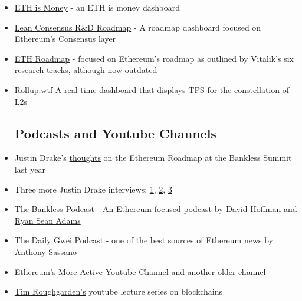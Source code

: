 \documentclass[12pt]{article}
\begin{document}
\begin{itemize}
    \item \href{https://www.ethismoney.xyz/}{ETH is Money} - an ETH is money dashboard
    \item \href{https://leanroadmap.org/}{Lean Consensus R\&D Roadmap} - A roadmap dashboard focused on Ethereum's Consensus layer
    \item \href{https://ethroadmap.com/}{ETH Roadmap} - focused on Ethereum's roadmap as outlined by Vitalik's six research tracks, although now outdated
    \item \href{https://rollup.wtf/}{Rollup.wtf} A real time dashboard that displays TPS for the constellation of L2s
    
\subsection{Podcasts and Youtube Channels}
    \item Justin Drake's \href{https://youtu.be/8mJDt8TGebc?si=pu-F31lkjmbDXMcA}{thoughts} on the Ethereum Roadmap at the Bankless Summit last year
    \item Three more Justin Drake interviews: \href{https://youtu.be/0q-qT67yyVs?si=gOJnrS50vgXIHTEv}{1}, \quad \href{https://youtu.be/jUFVOUq0-fc?si=Q0UiEPqx4iAnnTSS}{2}, \quad \href{https://youtu.be/88FDeg5JaUk?si=VWmv2tByzgNVo0oZ}{3}
    \item \href{https://www.youtube.com/@Bankless}{The Bankless Podcast} - An Ethereum focused podcast by \href{https://x.com/TrustlessState}{David Hoffman} and \href{https://x.com/RyanSAdams}{Ryan Sean Adams}
    \item \href{https://www.youtube.com/@TheDailyGwei}{The Daily Gwei Podcast} - one of the best sources of Ethereum news by \href{https://x.com/sassal0x}{Anthony Sassano}
    \item \href{https://www.youtube.com/@EthereumProtocol}{Ethereum's More Active Youtube Channel} and another \href{https://www.youtube.com/@EthereumFoundation}{older channel}
    \item \href{https://www.youtube.com/watch?v=KNJGPI0fuFA&list=PLEGCF-WLh2RLOHv_xUGLqRts_9JxrckiA}{Tim Roughgarden's} youtube lecture series on blockchains


\end{itemize}
\end{document}
